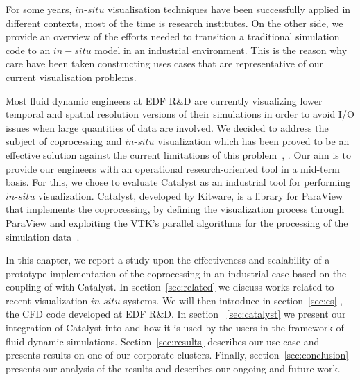 For some years, $in$-$situ$ visualisation techniques have been successfully applied in different contexts, most of the time is research institutes. On the other side, we provide an overview of the efforts needed to transition a traditional simulation code to an $in-situ$ model in an industrial environment. This is the reason why care have been taken constructing uses cases that are representative of our current visualisation problems. 

Most fluid dynamic engineers at EDF R\&D are currently visualizing lower temporal and spatial 
resolution versions of their simulations in order to avoid I/O issues when large quantities of data are involved.
We decided to address the subject of coprocessing and $in$-$situ$
visualization which has been proved to be an effective solution against the current
limitations of this problem~\cite{sandiareport}, \cite{4090186}. Our aim is to provide 
our engineers with an operational research-oriented tool in a mid-term basis.
For this, we chose to evaluate Catalyst as an industrial tool for performing
$in$-$situ$ visualization. 
Catalyst, developed by Kitware, is a library for ParaView that implements the
coprocessing, by defining the visualization process through ParaView and
exploiting the VTK's parallel algorithms for the processing of the simulation
data~\cite{6092322}. 

In this chapter, we report a study upon the effectiveness and scalability of a
prototype implementation of the coprocessing in an industrial case based on the
coupling of \CS with Catalyst. In section~\ref{sec:related} we
discuss works related to recent visualization $in$-$situ$ systems. We will then
introduce in section~\ref{sec:cs} \CS, the CFD code developed at EDF
R\&D. In section ~\ref{sec:catalyst} we present our integration of Catalyst into
\CS and how it is used by the users in the framework of fluid dynamic
simulations. Section~\ref{sec:results} describes our use case and presents
results on one of our corporate clusters. Finally, section~\ref{sec:conclusion} 
presents our analysis of the results and describes our ongoing and future work.
